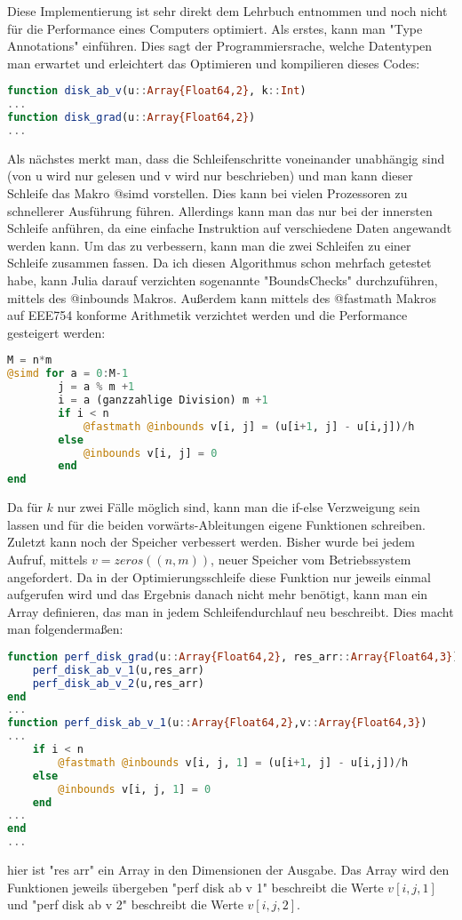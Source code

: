 \documentclass{article}
\theoremstyle{case}
\begin{document}
Diese Implementierung ist sehr direkt dem Lehrbuch entnommen und noch nicht für die Performance eines Computers optimiert. Als erstes, kann man "Type Annotations" einführen. Dies sagt der Programmiersrache, welche Datentypen man erwartet und erleichtert das Optimieren und kompilieren dieses Codes:
\begin{lstlisting}[language=Julia]
function disk_ab_v(u::Array{Float64,2}, k::Int)
...
function disk_grad(u::Array{Float64,2})
...
\end{lstlisting}
Als nächstes merkt man, dass die Schleifenschritte voneinander unabhängig sind (von u wird nur gelesen und v wird nur beschrieben) und man kann dieser Schleife das Makro @simd vorstellen. Dies kann bei vielen Prozessoren zu schnellerer Ausführung führen. Allerdings kann man das nur bei der innersten Schleife anführen, da eine einfache Instruktion auf verschiedene Daten angewandt werden kann. Um das zu verbessern, kann man die zwei Schleifen zu einer Schleife zusammen fassen. Da ich diesen Algorithmus schon mehrfach getestet habe, kann Julia darauf verzichten sogenannte "BoundsChecks" durchzuführen, mittels des @inbounds Makros. Außerdem kann mittels des @fastmath Makros auf EEE754 konforme Arithmetik verzichtet werden und die Performance gesteigert werden:
\begin{lstlisting}[language=Julia]
M = n*m
@simd for a = 0:M-1
		j = a % m +1
		i = a (ganzzahlige Division) m +1
		if i < n
			@fastmath @inbounds v[i, j] = (u[i+1, j] - u[i,j])/h
		else
			@inbounds v[i, j] = 0
		end
end
\end{lstlisting}
Da für $k$ nur zwei Fälle möglich sind, kann man die if-else Verzweigung sein lassen und für die beiden vorwärts-Ableitungen eigene Funktionen schreiben.
Zuletzt kann noch der Speicher verbessert werden. Bisher wurde bei jedem Aufruf, mittels $v=zeros((n,m))$, neuer Speicher vom Betriebssystem angefordert. Da in der Optimierungsschleife diese Funktion nur jeweils einmal aufgerufen wird und das Ergebnis danach nicht mehr benötigt, kann man ein Array definieren, das man in jedem Schleifendurchlauf neu beschreibt. Dies macht man folgendermaßen:
\begin{lstlisting}[language=Julia]
function perf_disk_grad(u::Array{Float64,2}, res_arr::Array{Float64,3})
	perf_disk_ab_v_1(u,res_arr)
	perf_disk_ab_v_2(u,res_arr)
end
...
function perf_disk_ab_v_1(u::Array{Float64,2},v::Array{Float64,3})
...
	if i < n
		@fastmath @inbounds v[i, j, 1] = (u[i+1, j] - u[i,j])/h
	else
		@inbounds v[i, j, 1] = 0
	end
...
end
...
\end{lstlisting}
hier ist "res arr" ein Array in den Dimensionen der Ausgabe. Das Array wird den Funktionen jeweils übergeben "perf disk ab v 1" beschreibt die Werte $v[i,j,1]$ und "perf disk ab v 2" beschreibt die Werte $v[i,j,2]$.
\end{document}
